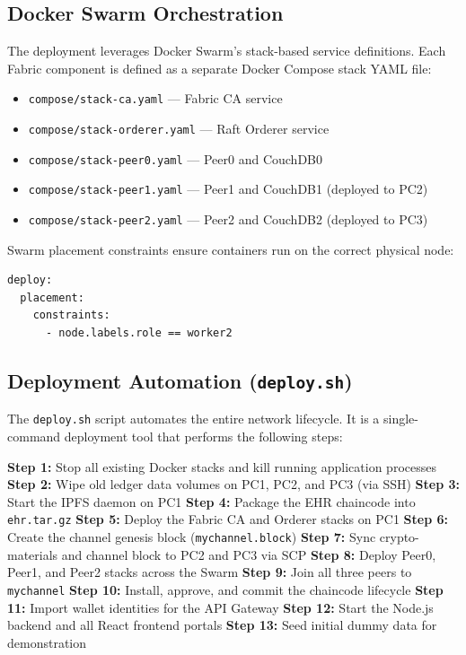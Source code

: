 \subsection{Docker Swarm Orchestration}

The deployment leverages Docker Swarm's stack-based service definitions. Each Fabric component is defined as a separate Docker Compose stack YAML file:

\begin{itemize}
    \item \texttt{compose/stack-ca.yaml} — Fabric CA service
    \item \texttt{compose/stack-orderer.yaml} — Raft Orderer service
    \item \texttt{compose/stack-peer0.yaml} — Peer0 and CouchDB0
    \item \texttt{compose/stack-peer1.yaml} — Peer1 and CouchDB1 (deployed to PC2)
    \item \texttt{compose/stack-peer2.yaml} — Peer2 and CouchDB2 (deployed to PC3)
\end{itemize}

Swarm placement constraints ensure containers run on the correct physical node:
\begin{lstlisting}[language=bash, caption={Placement Constraint Example (stack-peer1.yaml)}]
deploy:
  placement:
    constraints:
      - node.labels.role == worker2
\end{lstlisting}

\subsection{Deployment Automation (\texttt{deploy.sh})}

The \texttt{deploy.sh} script automates the entire network lifecycle. It is a single-command deployment tool that performs the following steps:

\begin{algorithm}[H]
\caption{One-Click Network Deployment}
\label{alg:deploy}
\begin{algorithmic}[1]
    \State \textbf{Step 1:} Stop all existing Docker stacks and kill running application processes
    \State \textbf{Step 2:} Wipe old ledger data volumes on PC1, PC2, and PC3 (via SSH)
    \State \textbf{Step 3:} Start the IPFS daemon on PC1
    \State \textbf{Step 4:} Package the EHR chaincode into \texttt{ehr.tar.gz}
    \State \textbf{Step 5:} Deploy the Fabric CA and Orderer stacks on PC1
    \State \textbf{Step 6:} Create the channel genesis block (\texttt{mychannel.block})
    \State \textbf{Step 7:} Sync crypto-materials and channel block to PC2 and PC3 via SCP
    \State \textbf{Step 8:} Deploy Peer0, Peer1, and Peer2 stacks across the Swarm
    \State \textbf{Step 9:} Join all three peers to \texttt{mychannel}
    \State \textbf{Step 10:} Install, approve, and commit the chaincode lifecycle
    \State \textbf{Step 11:} Import wallet identities for the API Gateway
    \State \textbf{Step 12:} Start the Node.js backend and all React frontend portals
    \State \textbf{Step 13:} Seed initial dummy data for demonstration
\EndProcedure
\end{algorithmic}
\end{algorithm}

